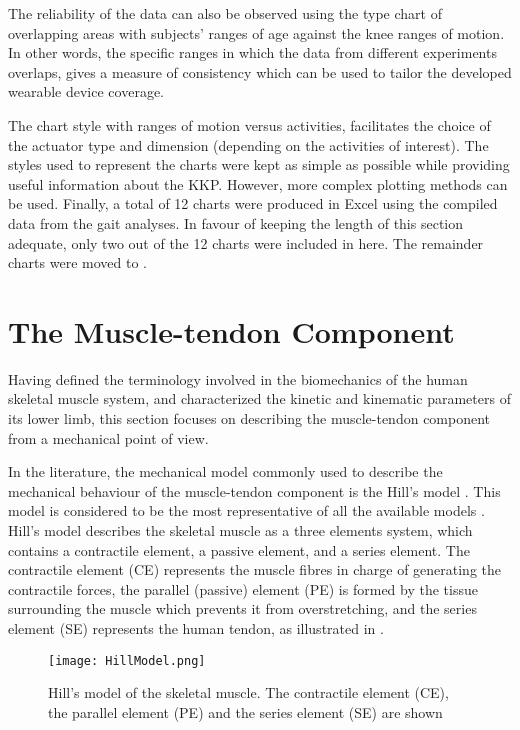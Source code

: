 The reliability of the data can also be observed using the type chart of overlapping areas with subjects' ranges of age against the knee ranges of motion. In other words, the specific ranges in which the data from different experiments overlaps, gives a measure of consistency which can be used to tailor the developed wearable device coverage. 

The chart style with ranges of motion versus activities, facilitates the choice of the actuator type and dimension (depending on the activities of interest). The styles used to represent the charts were kept as simple as possible while providing useful information about the KKP. However, more complex plotting methods can be used. Finally, a total of 12 charts were produced in Excel\textregistered{} using the compiled data from the gait analyses. In favour of keeping the length of this section adequate, only two out of the 12 charts were included in here. The remainder charts were moved to .

\section{The Muscle-tendon Component} \label{sec:muscle_tendon}

Having defined the terminology involved in the biomechanics of the human skeletal muscle system, and characterized the kinetic and kinematic parameters of its lower limb, this section focuses on describing the muscle-tendon component from a mechanical point of view. 

In the literature, the mechanical model commonly used to describe the mechanical behaviour of the muscle-tendon component is the Hill's model \cite{hill1938heat}. This model is considered to be the most representative of all the available models \cite{zhang2012sma}. Hill's model describes the skeletal muscle as a three elements system, which contains a contractile element, a passive element, and a series element. The contractile element (CE) represents the muscle fibres in charge of generating the contractile forces, the parallel (passive) element (PE) is formed by the tissue surrounding the muscle which prevents it from overstretching, and the series element (SE) represents the human tendon, as illustrated in .

\begin{figure}[htb!]
    \centering
    \texttt{[image: HillModel.png]}
    \caption{Hill's model of the skeletal muscle. The contractile element (CE), the parallel element (PE) and the series element (SE) are shown \cite{hill1938heat} }
    \label{fig:hillModel}
\end{figure}

